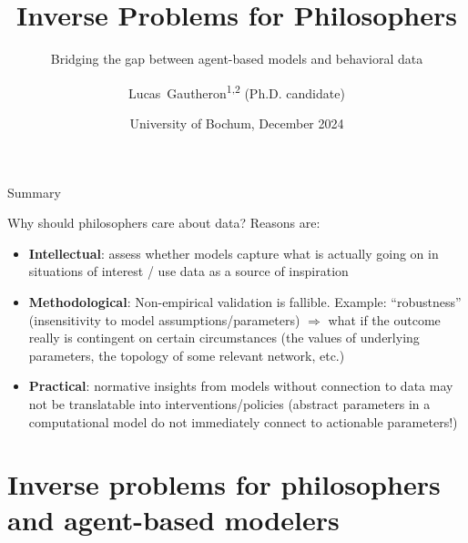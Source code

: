 \documentclass[10pt]{beamer}
\title[Inverse Problems for Philosophers] %
{
Inverse Problems for Philosophers
}
\subtitle{Bridging the gap between agent-based models and behavioral data}
\author[L.~Gautheron]
{Lucas~Gautheron\textsuperscript{1,2} (Ph.D. candidate)
}
\institute[IZWT, ENS] %
{
  \inst{1}
  Interdisciplinary Center for Science and Technology Studies, Wuppertal, Germany\\
  \inst{2} Département d'Études Cognitives, École Normale Supérieure, Paris, France
}
\date[13/12/2024] %
{University of Bochum, December 2024}
\begin{document}
\frame{
\titlepage
}

\begin{frame}{Summary}
    \tableofcontents
\end{frame}

\begin{frame}{Why should philosophers care about data?}
Reasons are:
    \begin{itemize}
        \item<1-> \textbf{Intellectual}: assess whether models capture what is actually going on in situations of interest / use data as a source of inspiration
        \item<2-> \textbf{Methodological}: Non-empirical validation is fallible. Example: ``robustness'' (insensitivity to model assumptions/parameters) $\Rightarrow$ what if the outcome really is contingent on certain circumstances (the values of underlying parameters, the topology of some relevant network, etc.)
        \item<3-> \textbf{Practical}: normative insights from models without connection to data may not be translatable into interventions/policies (abstract parameters in a computational model do not immediately connect to actionable parameters!)
    \end{itemize}
\end{frame}




\section{Inverse problems for philosophers and agent-based modelers}
\end{document}
